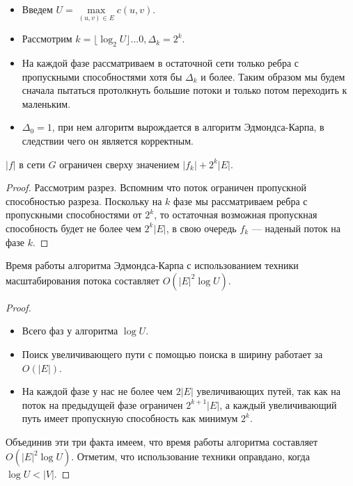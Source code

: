 \documentclass[a4paper,14pt]{article}
\begin{document}
    \begin{itemize}
        \item Введем $U=\max\limits_{(u, v)\in E} c(u, v)$.
        \item Рассмотрим $k=\lfloor \log_2 U\rfloor \ldots 0, \Delta_k=2^k$.
        \item На каждой фазе рассматриваем в остаточной сети только
        ребра с пропускными способностями хотя бы $\Delta_k$ и более.
        Таким образом мы будем сначала пытаться протолкнуть
        большие потоки и только потом переходить к маленьким.
        \item $\Delta_0=1$, при нем алгоритм вырождается в алгоритм
        Эдмондса-Карпа, в следствии чего он является корректным.
    \end{itemize}
    \begin{lemma}
        $|f|$ в сети $G$ ограничен сверху значением $|f_k|+2^k|E|$.
    \end{lemma}
    \begin{proof}
        Рассмотрим разрез. Вспомним что поток ограничен пропускной
способностью разреза. Поскольку на $k$ фазе мы рассматриваем
ребра с пропускными способностями от $2^k$, то остаточная
возможная пропускная способность будет не более чем $2^k|E|$, в
свою очередь $f_k$ — наденый поток на фазе $k$.
    \end{proof}
    \begin{lemma}
        Время работы алгоритма Эдмондса-Карпа с использованием
техники масштабирования потока составляет $O(|E|^2\log U)$.
    \end{lemma}
    \begin{proof}
        \begin{itemize}
            \item Всего фаз у алгоритма $\log U$.
            \item Поиск увеличивающего пути с помощью поиска в ширину
            работает за $O(|E|)$.
            \item На каждой фазе у нас не более чем $2|E|$ увеличивающих путей,
            так как на поток на предыдущей фазе ограничен $2^{k+1}|E|$, а
            каждый увеличивающий путь имеет пропускную способность
            как минимум $2^k$.
        \end{itemize}
        Объединив эти три факта имеем, что время работы алгоритма
составляет $O(|E|^2\log U)$. Отметим, что использование техники
оправдано, когда $\log U < |V|$.
    \end{proof}
\end{document}
